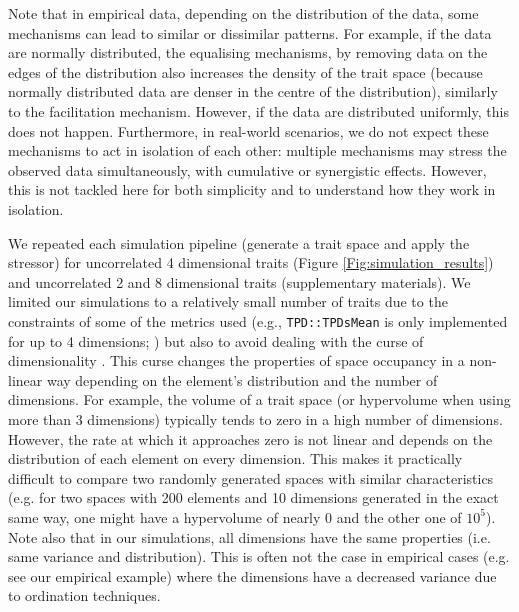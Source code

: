 \documentclass[12pt,letterpaper]{article}
\begin{document}
Note that in empirical data, depending on the distribution of the data, some mechanisms can lead to similar or dissimilar patterns.
For example, if the data are normally distributed, the equalising mechanisms, by removing data on the edges of the distribution also increases the density of the trait space (because normally distributed data are denser in the centre of the distribution), similarly to the facilitation mechanism.
However, if the data are distributed uniformly, this does not happen.
Furthermore, in real-world scenarios, we do not expect these mechanisms to act in isolation of each other: multiple mechanisms may stress the observed data simultaneously, with cumulative or synergistic effects.
However, this is not tackled here for both simplicity and to understand how they work in isolation. 

We repeated each simulation pipeline (generate a trait space and apply the stressor) for uncorrelated 4 dimensional traits (Figure \ref{Fig:simulation_results}) and uncorrelated 2 and 8 dimensional traits (supplementary materials).
We limited our simulations to a relatively small number of traits due to the constraints of some of the metrics used (e.g., \texttt{TPD::TPDsMean} is only implemented for up to 4 dimensions; \citealt{carmona2019trait}) but also to avoid dealing with the curse of dimensionality \citep{bellman1957dynamic}.
This curse changes the properties of space occupancy in a non-linear way depending on the element's distribution and the number of dimensions.
For example, the volume of a trait space (or hypervolume when using more than 3 dimensions) typically tends to zero in a high number of dimensions.
However, the rate at which it approaches zero is not linear and depends on the distribution of each element on every dimension.
This makes it practically difficult to compare two randomly generated spaces with similar characteristics (e.g. for two spaces with 200 elements and 10 dimensions generated in the exact same way, one might have a hypervolume of nearly 0 and the other one of $10^5$).
Note also that in our simulations, all dimensions have the same properties (i.e. same variance and distribution).
This is often not the case in empirical cases (e.g. see our empirical example) where the dimensions have a decreased variance due to ordination techniques.
 
\end{document}

